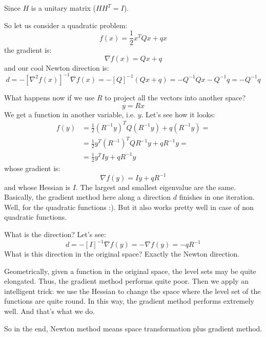 Since $H$ is a unitary matrix ($H H^T = I$).
\par So let us consider a quadratic problem:
\begin{equation}
    f(x) = \frac{1}{2} x^T Q x + q x
\end{equation}
the gradient is:
\begin{equation}
    \nabla f(x) = Q x + q
\end{equation}
and our cool Newton direction is:
\begin{equation}
    d = - [\nabla^2 f(x)]^{-1} \nabla f(x) = - [Q]^{-1} (Q x + q) = - Q^{-1} Q x - Q^{-1} q = - Q^{-1}q
\end{equation}
\par What happens now if we use $R$ to project all the vectors into another space?
\begin{equation}
    y = R x
\end{equation}
We get a function in another variable, i.e. $y$. Let's see how it looks:
\begin{align}
    f(y) &= \frac{1}{2} (R^{-1}y)^T Q (R^{-1}y) + q (R^{-1}y) =\\
    &=\frac{1}{2} y^T (R^{-1})^T Q R^{-1} y + q R^{-1} y =\\
    &=\frac{1}{2} y^T I y + q R^{-1} y
\end{align}
whose gradient is:
\begin{equation}
    \nabla f(y) = I y + q R^{-1}
\end{equation}
and whose Hessian is $I$. The largest and smallest eigenvalue are the same. Basically, the gradient method here along a direction $d$ finishes in one iteration. Well, for the quadratic functions :). But it also works pretty well in case of non quadratic functions.
\par What is the direction? Let's see:
\begin{equation}
    d = - [I]^{-1} \nabla f(y) = - \nabla f(y) = - q R^{-1}
\end{equation}
What is this direction in the original space? Exactly the Newton direction.
\par Geometrically, given a function in the original space, the level sets may be quite elongated. Thus, the gradient method performs quite poor. Then we apply an intelligent trick: we use the Hessian to change the space where the level set of the functions are quite round. In this way, the gradient method performs extremely well. And that's what we do.
\par So in the end, Newton method means space transformation plus gradient method.
%
